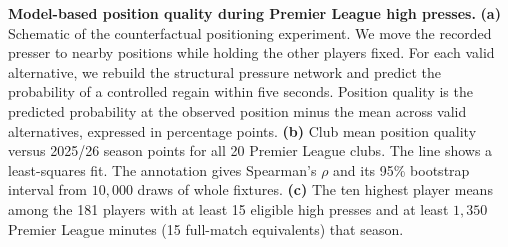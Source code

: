 \caption{\textbf{Model-based position quality during Premier League high presses.} \textbf{(a)} Schematic of the counterfactual positioning experiment. We move the recorded presser to nearby positions while holding the other players fixed. For each valid alternative, we rebuild the structural pressure network and predict the probability of a controlled regain within five seconds. Position quality is the predicted probability at the observed position minus the mean across valid alternatives, expressed in percentage points. \textbf{(b)} Club mean position quality versus 2025/26 season points for all 20 Premier League clubs. The line shows a least-squares fit. The annotation gives Spearman's $\rho$ and its 95\% bootstrap interval from $10{,}000$ draws of whole fixtures. \textbf{(c)} The ten highest player means among the 181 players with at least 15 eligible high presses and at least $1{,}350$ Premier League minutes (15 full-match equivalents) that season.}
